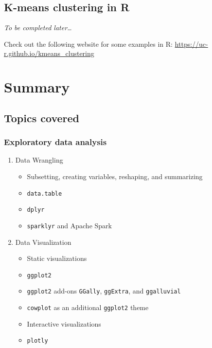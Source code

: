 \documentclass[
]{book}
\providecommand{\tightlist}{%
  \setlength{\itemsep}{0pt}\setlength{\parskip}{0pt}}
\begin{document}
\hypertarget{k-means-clustering-in-r}{%
\section{K-means clustering in R}\label{k-means-clustering-in-r}}

\emph{To be completed later\ldots{}}

Check out the following website for some examples in R: \url{https://uc-r.github.io/kmeans_clustering}

\hypertarget{summary-1}{%
\chapter{Summary}\label{summary-1}}

\hypertarget{topics-covered}{%
\section{Topics covered}\label{topics-covered}}

\hypertarget{exploratory-data-analysis}{%
\subsection{Exploratory data analysis}\label{exploratory-data-analysis}}

\begin{enumerate}
\def\labelenumi{\arabic{enumi}.}
\tightlist
\item
  Data Wrangling

  \begin{itemize}
  \tightlist
  \item
    Subsetting, creating variables, reshaping, and summarizing
  \item
    \texttt{data.table}
  \item
    \texttt{dplyr}
  \item
    \texttt{sparklyr} and Apache Spark
  \end{itemize}
\item
  Data Visualization

  \begin{itemize}
  \tightlist
  \item
    Static visualizations
  \item
    \texttt{ggplot2}
  \item
    \texttt{ggplot2} add-ons \texttt{GGally}, \texttt{ggExtra}, and \texttt{ggalluvial}
  \item
    \texttt{cowplot} as an additional \texttt{ggplot2} theme
  \item
    Interactive visualizations
  \item
    \texttt{plotly}
  \end{itemize}
\end{enumerate}
\end{document}
